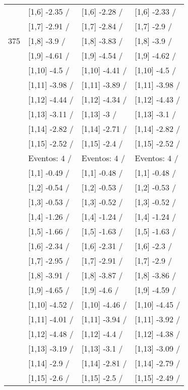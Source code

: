 \begin{table}
\begin{tabular}[t]{llll}
 & {}[1,6] -2.35  / & {}[1,6] -2.28  / & {}[1,6] -2.33  /\\
 & {}[1,7] -2.91  / & {}[1,7] -2.84  / & {}[1,7] -2.9  /\\
375 & {}[1,8] -3.9  / & {}[1,8] -3.83  / & {}[1,8] -3.9  /\\
\addlinespace
 & {}[1,9] -4.61  / & {}[1,9] -4.54  / & {}[1,9] -4.62  /\\
 & {}[1,10] -4.5  / & {}[1,10] -4.41  / & {}[1,10] -4.5  /\\
 & {}[1,11] -3.98  / & {}[1,11] -3.89  / & {}[1,11] -3.98  /\\
 & {}[1,12] -4.44  / & {}[1,12] -4.34  / & {}[1,12] -4.43  /\\
 & {}[1,13] -3.11  / & {}[1,13] -3  / & {}[1,13] -3.1  /\\
\addlinespace
 & {}[1,14] -2.82  / & {}[1,14] -2.71  / & {}[1,14] -2.82  /\\
 & {}[1,15] -2.52  / & {}[1,15] -2.4  / & {}[1,15] -2.52  /\\
 & Eventos:  4 / & Eventos:  4 / & Eventos:  4 /\\
 & {}[1,1] -0.49  / & {}[1,1] -0.48  / & {}[1,1] -0.48  /\\
 & {}[1,2] -0.54  / & {}[1,2] -0.53  / & {}[1,2] -0.53  /\\
\addlinespace
 & {}[1,3] -0.53  / & {}[1,3] -0.52  / & {}[1,3] -0.52  /\\
 & {}[1,4] -1.26  / & {}[1,4] -1.24  / & {}[1,4] -1.24  /\\
 & {}[1,5] -1.66  / & {}[1,5] -1.63  / & {}[1,5] -1.63  /\\
 & {}[1,6] -2.34  / & {}[1,6] -2.31  / & {}[1,6] -2.3  /\\
 & {}[1,7] -2.95  / & {}[1,7] -2.91  / & {}[1,7] -2.9  /\\
\addlinespace
500 & {}[1,8] -3.91  / & {}[1,8] -3.87  / & {}[1,8] -3.86  /\\
 & {}[1,9] -4.65  / & {}[1,9] -4.6  / & {}[1,9] -4.59  /\\
 & {}[1,10] -4.52  / & {}[1,10] -4.46  / & {}[1,10] -4.45  /\\
 & {}[1,11] -4.01  / & {}[1,11] -3.94  / & {}[1,11] -3.92  /\\
 & {}[1,12] -4.48  / & {}[1,12] -4.4  / & {}[1,12] -4.38  /\\
\addlinespace
 & {}[1,13] -3.19  / & {}[1,13] -3.1  / & {}[1,13] -3.09  /\\
 & {}[1,14] -2.9  / & {}[1,14] -2.81  / & {}[1,14] -2.79  /\\
 & {}[1,15] -2.6  / & {}[1,15] -2.5  / & {}[1,15] -2.49  /\\
\bottomrule
\end{tabular}
\end{table}
